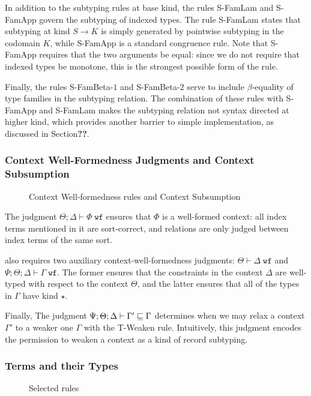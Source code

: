 In addition to the subtyping rules at base kind, the rules S-FamLam and S-FamApp govern the subtyping of indexed types. The rule S-FamLam states that subtyping at kind $S \to K$ is simply generated by pointwise subtyping in the codomain $K$, while S-FamApp is a standard congruence rule. Note that S-FamApp requires that the two arguments be equal: since we do not require that indexed types be monotone, this is the strongest possible form of the rule.

Finally, the rules S-FamBeta-$1$ and S-FamBeta-$2$ serve to include $\beta$-equality of type families in the subtyping relation. The combination of these rules with S-FamApp and S-FamLam makes the subtyping relation not syntax directed at higher kind, which provides another barrier to simple implementation, as discussed in Section\textbf{??}.

\subsubsection{Context Well-Formedness Judgments and Context Subsumption}
\begin{figure}

\label{fig:dlambdaamor-ctx-wf-rules}
\caption{Context Well-formedness rules and Context Subsumption}
\end{figure}
The judgment $\Theta ; \Delta \vdash \Phi \; \texttt{wf}$ ensures that $\Phi$ is a well-formed context: all index terms mentioned in it are sort-correct, and relations are only judged between index terms of the same sort.

\dlambdaamor also requires two auxiliary context-well-formedness judgments: $\Theta \vdash \Delta \; \texttt{wf}$ and $\Psi ; \Theta ; \Delta \vdash \Gamma \; \texttt{wf}$. The former ensures that the constraints in the context $\Delta$ are well-typed with respect to the context $\Theta$, and the latter ensures that all of the types in $\Gamma$ have kind $\star$.

Finally, The judgment $\Psi ; \Theta ; \Delta \vdash \Gamma' \sqsubseteq \Gamma$ determines when we may relax a context $\Gamma'$ to a weaker one $\Gamma$ with the T-Weaken rule. Intuitively, this judgment encodes the permission to weaken a context as a kind of record subtyping.


\subsubsection{Terms and their Types}
\begin{figure}

\label{fig:dlambdaamor-selected-typing-rules}
\caption{Selected \dlambdaamor rules}
\end{figure}

